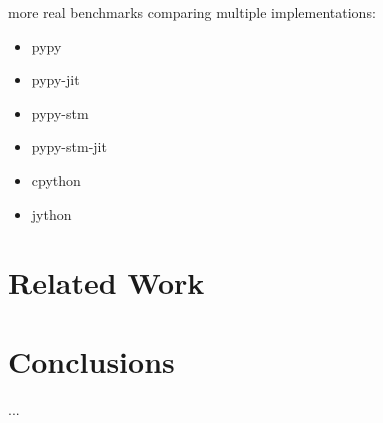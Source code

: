 \documentclass{sigplanconf}
\begin{document}
more real benchmarks comparing multiple implementations:
\begin{itemize}[noitemsep]
\item pypy
\item pypy-jit
\item pypy-stm
\item pypy-stm-jit
\item cpython
\item jython
\end{itemize}


\section{Related Work}


\section{Conclusions}




\acks
...




\end{document}

